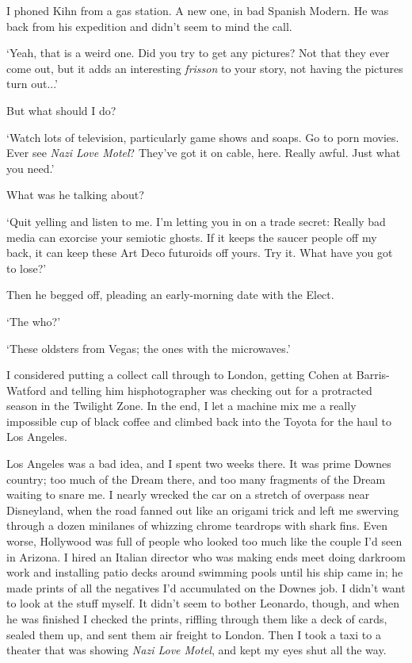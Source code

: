 I phoned Kihn from a gas station. A new one, in bad Spanish Modern. He was back from his expedition and didn't seem to mind the call.

`Yeah, that is a weird one. Did you try to get any pictures? Not that they ever come out, but it adds an interesting \textit{frisson} to your story, not having the pictures turn out...'

But what should I do?

`Watch lots of television, particularly game shows and soaps. Go to porn movies. Ever see \textit{Nazi Love Motel}? They've got it on cable, here. Really awful. Just what you need.'

What was he talking about?

`Quit yelling and listen to me. I'm letting you in on a trade secret: Really bad media can exorcise your semiotic ghosts. If it keeps the saucer people off my back, it can keep these Art Deco futuroids off yours. Try it. What have you got to lose?'

Then he begged off, pleading an early-morning date with the Elect.

`The who?'

`These oldsters from Vegas; the ones with the microwaves.'

I considered putting a collect call through to London, getting Cohen at Barris-Watford and telling him hisphotographer was checking out for a protracted season in the Twilight Zone. In the end, I let a machine mix me a really impossible cup of black coffee and climbed back into the Toyota for the haul to Los Angeles.

Los Angeles was a bad idea, and I spent two weeks there. It was prime Downes country; too much of the Dream there, and too many fragments of the Dream waiting to snare me. I nearly wrecked the car on a stretch of overpass near Disneyland, when the road fanned out like an origami trick and left me swerving through a dozen minilanes of whizzing chrome teardrops with shark fins. Even worse, Hollywood was full of people who looked too much like the couple I'd seen in Arizona. I hired an Italian director who was making ends meet doing darkroom work and installing patio decks around swimming pools until his ship came in; he made prints of all the negatives I'd accumulated on the Downes job. I didn't want to look at the stuff myself. It didn't seem to bother Leonardo, though, and when he was finished I checked the prints, riffling through them like a deck of cards, sealed them up, and sent them air freight to London. Then I took a taxi to a theater that was showing \textit{Nazi Love Motel}, and kept my eyes shut all the way.

